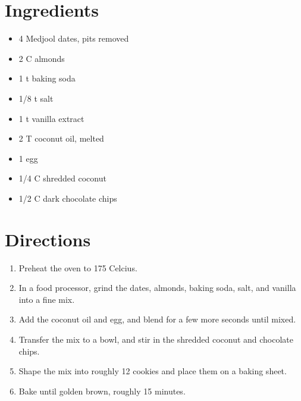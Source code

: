 \documentclass[letterpaper,10pt,english]{sphinxmanual}
\begin{document}
\section{Ingredients}
\label{chocolate_chip_cookies:ingredients}\begin{itemize}
\item {} 
4       Medjool dates, pits removed

\item {} 
2   C   almonds

\item {} 
1   t   baking soda

\item {} 
1/8     t   salt

\item {} 
1   t   vanilla extract

\item {} 
2   T   coconut oil, melted

\item {} 
1       egg

\item {} 
1/4     C   shredded coconut

\item {} 
1/2     C   dark chocolate chips

\end{itemize}


\section{Directions}
\label{chocolate_chip_cookies:directions}\begin{enumerate}
\item {} 
Preheat the oven to 175 Celcius.

\item {} 
In a food processor, grind the dates, almonds, baking soda, salt, and vanilla into a fine mix.

\item {} 
Add the coconut oil and egg, and blend for a few more seconds until mixed.

\item {} 
Transfer the mix to a bowl, and stir in the shredded coconut and chocolate chips.

\item {} 
Shape the mix into roughly 12 cookies and place them on a baking sheet.

\item {} 
Bake until golden brown, roughly 15 minutes.

\end{enumerate}
\end{document}
